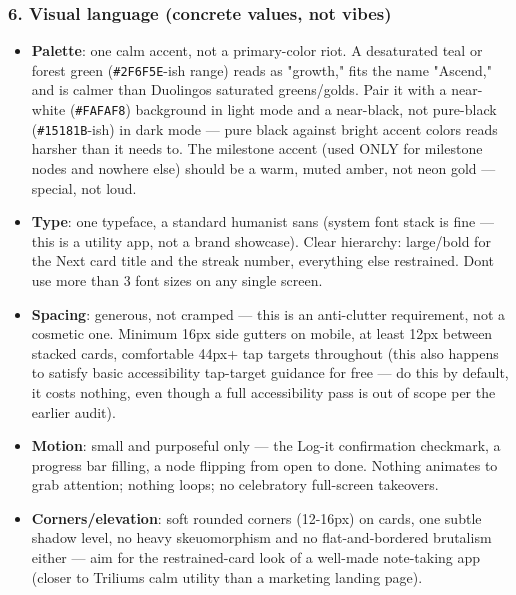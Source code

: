 \hypertarget{ui-ux-spec-6-visual-language-concrete-values-not-vibes}{%
\subsubsection{6. Visual language (concrete values, not
vibes)}\label{ui-ux-spec-6-visual-language-concrete-values-not-vibes}}

\begin{itemize}
\tightlist
\item
  \textbf{Palette}: one calm accent, not a primary-color riot. A
  desaturated teal or forest green (\texttt{\#2F6F5E}-ish range) reads
  as "growth," fits the name "Ascend," and is calmer than
  Duolingo\textquotesingle s saturated greens/golds. Pair it with a
  near-white (\texttt{\#FAFAF8}) background in light mode and a
  near-black, not pure-black (\texttt{\#15181B}-ish) in dark mode ---
  pure black against bright accent colors reads harsher than it needs
  to. The milestone accent (used ONLY for milestone nodes and nowhere
  else) should be a warm, muted amber, not neon gold --- special, not
  loud.
\item
  \textbf{Type}: one typeface, a standard humanist sans (system font
  stack is fine --- this is a utility app, not a brand showcase). Clear
  hierarchy: large/bold for the Next card title and the streak number,
  everything else restrained. Don\textquotesingle t use more than 3 font
  sizes on any single screen.
\item
  \textbf{Spacing}: generous, not cramped --- this is an anti-clutter
  requirement, not a cosmetic one. Minimum 16px side gutters on mobile,
  at least 12px between stacked cards, comfortable 44px+ tap targets
  throughout (this also happens to satisfy basic accessibility
  tap-target guidance for free --- do this by default, it costs nothing,
  even though a full accessibility pass is out of scope per the earlier
  audit).
\item
  \textbf{Motion}: small and purposeful only --- the Log-it confirmation
  checkmark, a progress bar filling, a node flipping from open to done.
  Nothing animates to grab attention; nothing loops; no celebratory
  full-screen takeovers.
\item
  \textbf{Corners/elevation}: soft rounded corners (12-16px) on cards,
  one subtle shadow level, no heavy skeuomorphism and no
  flat-and-bordered brutalism either --- aim for the restrained-card
  look of a well-made note-taking app (closer to
  Trilium\textquotesingle s calm utility than a marketing landing page).
\end{itemize}

